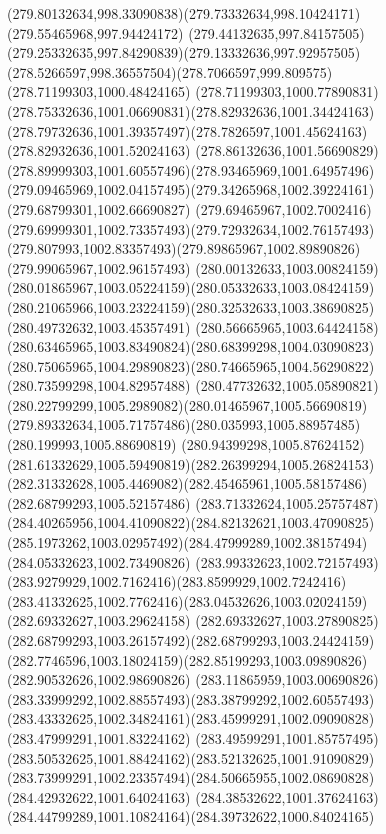 {    \curveto(279.80132634,998.33090838)(279.73332634,998.10424171)(279.55465968,997.94424172)
    \curveto(279.44132635,997.84157505)(279.25332635,997.84290839)(279.13332636,997.92957505)
    \curveto(278.5266597,998.36557504)(278.7066597,999.809575)(278.71199303,1000.48424165)
    \curveto(278.71199303,1000.77890831)(278.75332636,1001.06690831)(278.82932636,1001.34424163)
    \curveto(278.79732636,1001.39357497)(278.7826597,1001.45624163)(278.82932636,1001.52024163)
    \curveto(278.86132636,1001.56690829)(278.89999303,1001.60557496)(278.93465969,1001.64957496)
    \curveto(279.09465969,1002.04157495)(279.34265968,1002.39224161)(279.68799301,1002.66690827)
    \curveto(279.69465967,1002.7002416)(279.69999301,1002.73357493)(279.72932634,1002.76157493)
    \curveto(279.807993,1002.83357493)(279.89865967,1002.89890826)(279.99065967,1002.96157493)
    \curveto(280.00132633,1003.00824159)(280.01865967,1003.05224159)(280.05332633,1003.08424159)
    \curveto(280.21065966,1003.23224159)(280.32532633,1003.38690825)(280.49732632,1003.45357491)
    \curveto(280.56665965,1003.64424158)(280.63465965,1003.83490824)(280.68399298,1004.03090823)
    \curveto(280.75065965,1004.29890823)(280.74665965,1004.56290822)(280.73599298,1004.82957488)
    \curveto(280.47732632,1005.05890821)(280.22799299,1005.2989082)(280.01465967,1005.56690819)
    \curveto(279.89332634,1005.71757486)(280.035993,1005.88957485)(280.199993,1005.88690819)
    \curveto(280.94399298,1005.87624152)(281.61332629,1005.59490819)(282.26399294,1005.26824153)
    \curveto(282.31332628,1005.4469082)(282.45465961,1005.58157486)(282.68799293,1005.52157486)
    \curveto(283.71332624,1005.25757487)(284.40265956,1004.41090822)(284.82132621,1003.47090825)
    \curveto(285.1973262,1003.02957492)(284.47999289,1002.38157494)(284.05332623,1002.73490826)
    \curveto(283.99332623,1002.72157493)(283.9279929,1002.7162416)(283.8599929,1002.7242416)
    \curveto(283.41332625,1002.7762416)(283.04532626,1003.02024159)(282.69332627,1003.29624158)
    \curveto(282.69332627,1003.27890825)(282.68799293,1003.26157492)(282.68799293,1003.24424159)
    \curveto(282.7746596,1003.18024159)(282.85199293,1003.09890826)(282.90532626,1002.98690826)
    \curveto(283.11865959,1003.00690826)(283.33999292,1002.88557493)(283.38799292,1002.60557493)
    \curveto(283.43332625,1002.34824161)(283.45999291,1002.09090828)(283.47999291,1001.83224162)
    \curveto(283.49599291,1001.85757495)(283.50532625,1001.88424162)(283.52132625,1001.91090829)
    \curveto(283.73999291,1002.23357494)(284.50665955,1002.08690828)(284.42932622,1001.64024163)
    \curveto(284.38532622,1001.37624163)(284.44799289,1001.10824164)(284.39732622,1000.84024165)
}
